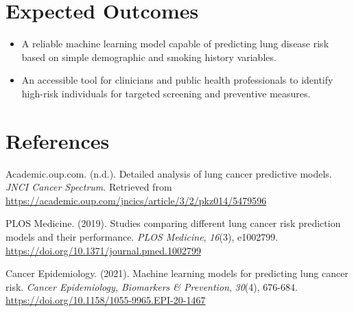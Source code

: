 \documentclass[12pt]{article}
\begin{document}
\section*{Expected Outcomes}

\begin{itemize}
    \item A reliable machine learning model capable of predicting lung disease risk based on simple demographic and smoking history variables.
    \item An accessible tool for clinicians and public health professionals to identify high-risk individuals for targeted screening and preventive measures.
\end{itemize}

\section*{References}

Academic.oup.com. (n.d.). Detailed analysis of lung cancer predictive models. \textit{JNCI Cancer Spectrum}. Retrieved from \url{https://academic.oup.com/jncics/article/3/2/pkz014/5479596}

PLOS Medicine. (2019). Studies comparing different lung cancer risk prediction models and their performance. \textit{PLOS Medicine}, \textit{16}(3), e1002799. \url{https://doi.org/10.1371/journal.pmed.1002799}

Cancer Epidemiology. (2021). Machine learning models for predicting lung cancer risk. \textit{Cancer Epidemiology, Biomarkers \& Prevention}, \textit{30}(4), 676-684. \url{https://doi.org/10.1158/1055-9965.EPI-20-1467}
\end{document}
